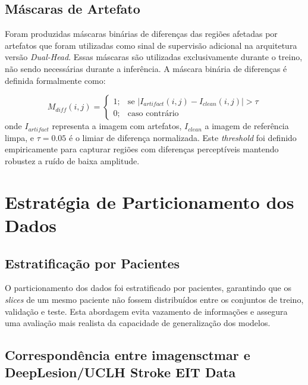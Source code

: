\subsection{Máscaras de Artefato}
Foram produzidas máscaras binárias de diferenças das regiões afetadas por artefatos que foram utilizadas como sinal de supervisão adicional na arquitetura versão \textit{Dual-Head}. Essas máscaras são utilizadas exclusivamente durante o treino, não sendo necessárias durante a inferência. A máscara binária de diferenças é definida formalmente como:

\begin{equation}
M_{diff}(i,j) = \begin{cases} 
1 ; & \text{se } |I_{artifact}(i,j) - I_{clean}(i,j)| > \tau \\
0 ; & \text{caso contrário}
\end{cases}
\end{equation}
\noindent onde $I_{artifact}$ representa a imagem com artefatos, $I_{clean}$ a imagem de referência limpa, e $\tau = 0.05$ é o limiar de diferença normalizada. Este \textit{threshold} foi definido empiricamente para capturar regiões com diferenças perceptíveis mantendo robustez a ruído de baixa amplitude.
\section{Estratégia de Particionamento dos Dados}

\subsection{Estratificação por Pacientes}

O particionamento dos dados foi estratificado por pacientes, garantindo que os \textit{slices} de um mesmo paciente não fossem distribuídos entre os conjuntos de treino, validação e teste. Esta abordagem evita vazamento de informações e assegura uma avaliação mais realista da capacidade de generalização dos modelos.%
\subsection{Correspondência entre imagens\acrshort{ctmar} e DeepLesion/UCLH Stroke EIT Data}

